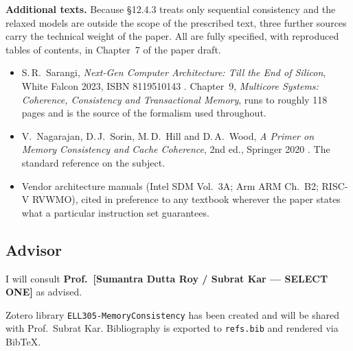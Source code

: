 \noindent\textbf{Additional texts.} Because \S12.4.3 treats only sequential
consistency and the relaxed models are outside the scope of the prescribed
text, three further sources carry the technical weight of the paper.
All are fully specified, with reproduced tables of contents, in
Chapter~7 of the paper draft.

\begin{itemize}[leftmargin=*,itemsep=2pt]
\item S.\,R.~Sarangi, \emph{Next-Gen Computer Architecture: Till the End of
  Silicon}, White Falcon 2023, ISBN 8119510143 \cite{sarangi2023nextgen}.
  Chapter~9, \emph{Multicore Systems: Coherence, Consistency and Transactional
  Memory}, runs to roughly 118 pages and is the source of the formalism used
  throughout.
\item V.~Nagarajan, D.\,J.~Sorin, M.\,D.~Hill and D.\,A.~Wood, \emph{A Primer
  on Memory Consistency and Cache Coherence}, 2nd ed., Springer 2020
  \cite{nagarajan2020primer}. The standard reference on the subject.
\item Vendor architecture manuals (Intel SDM Vol.~3A; Arm ARM Ch.~B2;
  RISC-V RVWMO), cited in preference to any textbook wherever the paper states
  what a particular instruction set guarantees.
\end{itemize}

\subsection{Advisor}

I will consult \textbf{Prof.~[Sumantra Dutta Roy / Subrat Kar --- SELECT ONE]}
as advised.

\medskip
\noindent Zotero library \texttt{ELL305-MemoryConsistency} has been created and
will be shared with Prof.~Subrat Kar. Bibliography is exported to
\texttt{refs.bib} and rendered via BibTeX.

